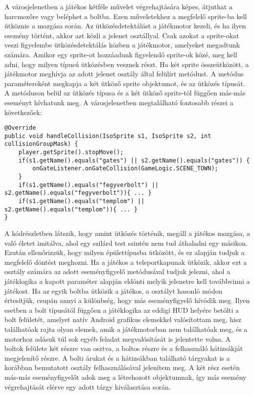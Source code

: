 A városjelenetben a játékos kétféle művelet végrehajtására képes, átjuthat a harcmezőre vagy beléphet a boltba. 
Ezen műveletekhez a megfelelő sprite-ba kell ütköznie a mozgása során. 
Az ütközésdetektálást a játékmotor kezeli, és ha ilyen esemény történt, akkor azt közli a jelenet osztállyal. 
Csak azokat a sprite-okat veszi figyelembe ütközésdetektálás közben a játékmotor, amelyeket megadtunk számára. 
Amikor egy sprite-ot hozzáadunk figyelendő sprite-ok közé, meg kell adni, hogy milyen típusú ütközésben vesznek részt. 
Ha két sprite összeütközött, a játékmotor meghívja az adott jelenet osztály által felülírt  metódust. 
A metódus paramétereként megkapja a két ütköző sprite objektumot, és az ütközés típusát. 
A metóduson belül az ütközés típusa és a két ütköző sprite-tól függően más-más eseményt hívhatunk meg. 
A városjelenetben megtalálható  fontosabb részei a következőek:

\begin{lstlisting}
@Override
public void handleCollision(IsoSprite s1, IsoSprite s2, int collisionGroupMask) {
    player.getSprite().stopMove();
    if(s1.getName().equals("gates") || s2.getName().equals("gates")) { 
        onGateListener.onGateCollision(GameLogic.SCENE_TOWN);
	}
    if(s1.getName().equals("fegyverbolt") || s2.getName().equals("fegyverbolt")){ ... }
    if(s1.getName().equals("templom") || s2.getName().equals("templom")){ ... }
}
\end{lstlisting}

A kódrészletben látszik, hogy amint ütközés történik, megáll a játékos mozgása, a való életet imitálva, ahol egy szilárd test szintén nem tud áthaladni egy másikon. 
Ezután ellenőrizzük, hogy milyen épülettípusba ütközött, és ez alapján tudjuk a megfelelő döntést meghozni. 
Ha a játékos a teleportkapunak ütközik, akkor ezt a  osztály számára az adott eseményfigyelő  metódusával tudjuk jelezni, ahol a játéklogika a kapott paraméter alapján eldönti melyik jelenetre kell továbbvinni a játékost. 
Ha az egyik boltba ütközik a játékos, a  osztályt hasonló módon értesítjük, csupán annyi a különbség, hogy más eseményfigyelő hívódik meg. 
Ilyen esetben a bolt típusától függően a játéklogika az eddigi HUD helyére betölti a bolt felületét, amelyet natív Android grafikus elemekkel valósítottam meg, hisz találhatóak rajta olyan elemek, amik a játékmotorban nem találhatóak meg, és a motorhoz adásuk túl sok egyéb feladat megvalósítását is jelentette volna. 
A boltok felülete két részre van osztva, a boltos részre és a felhasználó hátizsákját megjelenítő részre. 
A bolti árukat és a hátizsákban található tárgyakat is a korábban bemutatott  osztály felhasználásával jelenítem meg. 
A két rész esetén más-más eseményfigyelőt adok meg a létrehozott objektumnak, így más esemény végrehajtását elérve egy adott tárgy kiválasztása során. 

